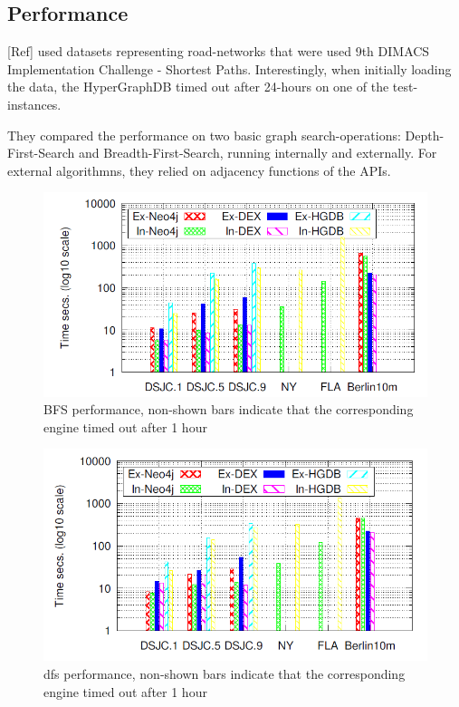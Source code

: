 \documentclass{acm_proc_article-sp}
\begin{document}
\subsection{Performance}

[Ref] used datasets representing road-networks that were used 9th DIMACS Implementation Challenge - Shortest Paths. Interestingly, when initially loading the data, the HyperGraphDB timed out after 24-hours on one of the test-instances.

They compared the performance on two basic graph search-operations: Depth-First-Search and Breadth-First-Search, running internally and externally. For external algorithmns, they relied on adjacency functions of the APIs.

\begin{figure}[hbtp]
	\centering
	\includegraphics[scale=0.35]{bfs.png}
	\caption{BFS performance, non-shown bars indicate that
		the corresponding engine timed out after 1 hour}
\end{figure}

\begin{figure}[hbtp]
	\centering
	\includegraphics[scale=0.35]{dfs.png}
	\caption{dfs performance, non-shown bars indicate that
		the corresponding engine timed out after 1 hour}
\end{figure}
\end{document}
